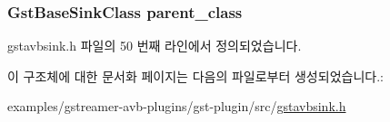 \subsubsection[{\texorpdfstring{parent\+\_\+class}{parent_class}}]{\setlength{\rightskip}{0pt plus 5cm}Gst\+Base\+Sink\+Class parent\+\_\+class}\hypertarget{struct___gst_avb_sink_class_a2bc403a7f110b207d2d90b189aff0d95}{}\label{struct___gst_avb_sink_class_a2bc403a7f110b207d2d90b189aff0d95}


gstavbsink.\+h 파일의 50 번째 라인에서 정의되었습니다.



이 구조체에 대한 문서화 페이지는 다음의 파일로부터 생성되었습니다.\+:\begin{DoxyCompactItemize}
\item 
examples/gstreamer-\/avb-\/plugins/gst-\/plugin/src/\hyperlink{gstavbsink_8h}{gstavbsink.\+h}\end{DoxyCompactItemize}
